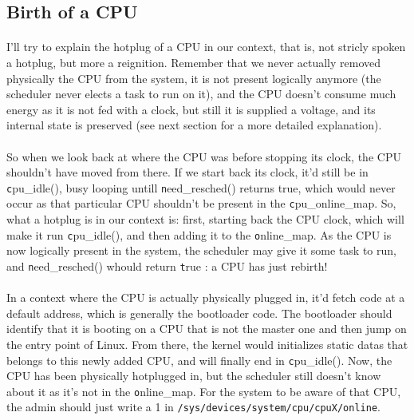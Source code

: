 \documentclass{report}
\renewcommand{\tt}[1]{\texttt{{{#1}}}}
\begin{document}
\subsection{Birth of a CPU}

\paragraph{}
I'll try to explain the hotplug of a CPU in our context, that is, not stricly
spoken a hotplug, but more a reignition. Remember that we never actually
removed physically the CPU from the system, it is not present logically anymore
(the scheduler never elects a task to run on it), and the CPU doesn't consume
much energy as it is not fed with a clock, but still it is supplied a voltage,
and its internal state is preserved (see next section for a more detailed
explanation).

\paragraph{}
So when we look back at where the CPU was before stopping its clock, the CPU
shouldn't have moved from there. If we start back its clock, it'd still be in
{\tt cpu\_idle()}, busy looping untill {\tt need\_resched()} returns true, which
would never occur as that particular CPU shouldn't be present in the {\tt
  cpu\_online\_map}. So, what a hotplug is in our context is: first, starting
back the CPU clock, which will make it run {\tt cpu\_idle()}, and then adding it
to the {\tt online\_map}. As the CPU is now logically present in the system, the
scheduler may give it some task to run, and {\tt need\_resched()} whould return
{\tt true} : a CPU has just rebirth!

\paragraph{}
In a context where the CPU is actually physically plugged in, it'd fetch code
at a default address, which is generally the bootloader code. The bootloader
should identify that it is booting on a CPU that is not the master one and then
jump on the entry point of Linux. From there, the kernel would initializes
static datas that belongs to this newly added CPU, and will finally end in {\tt
  cpu\_idle()}. Now, the CPU has been physically hotplugged in, but the
scheduler still doesn't know about it as it's not in the {\tt online\_map}. For
the system to be aware of that CPU, the admin should just write a 1 in
\tt{/sys/devices/system/cpu/cpuX/online}.
\end{document}
